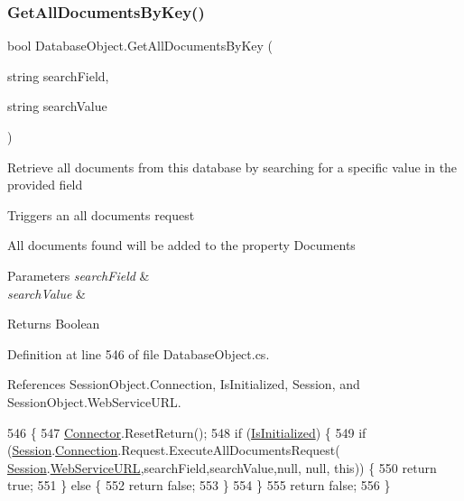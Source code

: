 \subsubsection{\texorpdfstring{Get\+All\+Documents\+By\+Key()}{GetAllDocumentsByKey()}}
{\footnotesize\ttfamily bool Database\+Object.\+Get\+All\+Documents\+By\+Key (\begin{DoxyParamCaption}\item[{string}]{search\+Field,  }\item[{string}]{search\+Value }\end{DoxyParamCaption})}



Retrieve all documents from this database by searching for a specific value in the provided field 

Triggers an all documents request

All documents found will be added to the property \textquotesingle{}Documents\textquotesingle{}


\begin{DoxyParams}{Parameters}
{\em search\+Field} & \\
\hline
{\em search\+Value} & \\
\hline
\end{DoxyParams}
\begin{DoxyReturn}{Returns}
Boolean
\end{DoxyReturn}


Definition at line 546 of file Database\+Object.\+cs.



References Session\+Object.\+Connection, Is\+Initialized, Session, and Session\+Object.\+Web\+Service\+U\+RL.


\begin{DoxyCode}
546                                                                              \{
547         \mbox{\hyperlink{class_connector}{Connector}}.ResetReturn();
548         \textcolor{keywordflow}{if} (\mbox{\hyperlink{class_database_object_a5fe036d32a30eb10d1b3f6a30263f740}{IsInitialized}}) \{
549             \textcolor{keywordflow}{if} (\mbox{\hyperlink{class_database_object_aa8484162b7d2a7c4c9426bca13c64c07}{Session}}.\mbox{\hyperlink{class_session_object_a014bdbf705a753540e19bfb53030c55c}{Connection}}.Request.ExecuteAllDocumentsRequest(
      \mbox{\hyperlink{class_database_object_aa8484162b7d2a7c4c9426bca13c64c07}{Session}}.\mbox{\hyperlink{class_session_object_a697c071c812fbf7ad1166b896fb44c16}{WebServiceURL}},searchField,searchValue,null, null, \textcolor{keyword}{this})) \{
550                 \textcolor{keywordflow}{return} \textcolor{keyword}{true};
551             \} \textcolor{keywordflow}{else} \{
552                 \textcolor{keywordflow}{return} \textcolor{keyword}{false};
553             \}
554         \}
555         \textcolor{keywordflow}{return} \textcolor{keyword}{false};
556     \}
\end{DoxyCode}
\mbox{\label{class_database_object_a4d8a7d73614f53a04fe8eb79bef2f614}} 
